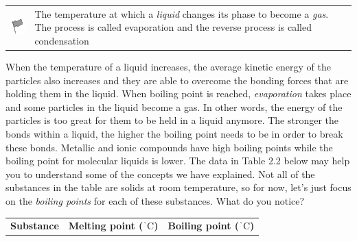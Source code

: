 \begin{enumerate}[noitemsep, label=\textbf{\arabic*}. ]
            \label{m38734*fhsst!!!underscore!!!id282}\begin{definition}
	  \begin{tabular*}{15 cm}{m{15 mm}m{}}
	\hspace*{-50pt}  \includegraphics[width=0.5in]{col11305.imgs/psflag2.png}   & \Definition{   \label{id2412302}\textbf{ Boiling point }} { \label{m38734*meaningfhsst!!!underscore!!!id282}
The temperature at which a \textsl{liquid} changes 
its phase to become a \textsl{gas}. The process is 
called evaporation and the reverse process is called condensation 
 } 
      \end{tabular*}
      \end{definition}
When the temperature of a liquid increases, the average 
kinetic energy of the particles also increases and they are able to overcome 
the bonding forces that are holding them in the liquid. When boiling point is 
reached, \textsl{evaporation} takes place and some 
particles in the liquid become a gas. In other words, the energy of the 
particles is too great for them to be held in a liquid anymore. The stronger the 
bonds within a liquid, the higher the boiling point needs to be in order to 
break these bonds. Metallic and ionic compounds have high boiling points while 
the boiling point for molecular liquids is lower.
The data in Table 2.2 below may help you to understand some of 
the concepts we have explained. Not all of the substances in the table are 
solids at room temperature, so for now, let's just focus on the \textsl{boiling points} for each of these substances. What do 
you notice?
          \begin{table}[H]
        \begin{center}
      \label{m38734*uid45}
    \noindent
      \tablelasttail{}
      \begin{xtabular}[t]{|l|l|l|}\hline
        \textbf{Substance} &
        \textbf{Melting 
point (${}^{\ensuremath{{\,}^{\circ}}}\mathrm{C}$)} &
        \textbf{Boiling point (${}^{\ensuremath{{\,}^{\circ}}}\mathrm{C}$)}%

\end{xtabular}
\end{center}
\end{table}
\end{enumerate}

